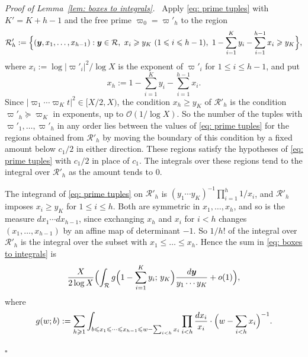 \documentclass{article}
\numberwithin{equation}{section}
\newenvironment{proof}[1][Proof]{\par\medskip\noindent\textit{#1.}\ }{\hfill$\square$\par\medskip}
\newcommand{\Le}{\leqslant}
\newcommand{\Ge}{\geqslant}
\begin{document}
\begin{proof}[Proof of Lemma~\ref{lem: boxes to integrals}]
Apply \eqref{eq: prime tuples} with $K' = K + h - 1$ and the free prime $\varpi_0 = \varpi'_h$ to the region
\begin{equation*}
\mathcal{R}'_h := \Bigl\{ (\boldsymbol{y}, x_1, \dots, x_{h-1}) : \boldsymbol{y} \in \mathcal{R},\ x_i \Ge y_K \ (1 \Le i \Le h - 1),\ 1 - \sum_{i=1}^{K} y_i - \sum_{i=1}^{h-1} x_i \Ge y_K \Bigr\},
\end{equation*}
where $x_i := \log|\varpi'_i|^2/\log X$ is the exponent of $\varpi'_i$ for $1 \Le i \Le h - 1$, and put
\begin{equation*}
x_h := 1 - \sum_{i=1}^{K} y_i - \sum_{i=1}^{h-1} x_i.
\end{equation*}
Since $|\varpi_1 \cdots \varpi_K t|^2 \in [X/2, X)$, the condition $x_h \Ge y_K$ of $\mathcal{R}'_h$ is the condition $\varpi'_h \succcurlyeq \varpi_K$ in exponents, up to $\mathcal{O}(1/\log X)$. So the number of the tuples with $\varpi'_1, \dots, \varpi'_h$ in any order lies between the values of \eqref{eq: prime tuples} for the regions obtained from $\mathcal{R}'_h$ by moving the boundary of this condition by a fixed amount below $c_1/2$ in either direction. These regions satisfy the hypotheses of \eqref{eq: prime tuples} with $c_1/2$ in place of $c_1$. The integrals over these regions tend to the integral over $\mathcal{R}'_h$ as the amount tends to $0$.

The integrand of \eqref{eq: prime tuples} on $\mathcal{R}'_h$ is $(y_1 \cdots y_K)^{-1} \prod_{i=1}^{h} 1/x_i$, and $\mathcal{R}'_h$ imposes $x_i \Ge y_K$ for $1 \Le i \Le h$. Both are symmetric in $x_1, \dots, x_h$, and so is the measure $dx_1 \cdots dx_{h-1}$, since exchanging $x_h$ and $x_i$ for $i < h$ changes $(x_1, \dots, x_{h-1})$ by an affine map of determinant $-1$. So $1/h!$ of the integral over $\mathcal{R}'_h$ is the integral over the subset with $x_1 \Le \dots \Le x_h$. Hence the sum in \eqref{eq: boxes to integrals} is
\begin{equation*}
\frac{X}{2\log X} \Bigl( \int_{\mathcal{R}} g\Bigl(1 - \sum_{i=1}^{K} y_i;\, y_K\Bigr) \frac{d\boldsymbol{y}}{y_1 \cdots y_K} + o(1) \Bigr),
\end{equation*}
where
\begin{equation*}
g(w; b) := \sum_{h \Ge 1} \int_{b \Le x_1 \Le \dots \Le x_{h-1} \Le w - \sum_{i < h} x_i} \prod_{i < h} \frac{dx_i}{x_i} \cdot \Bigl( w - \sum_{i < h} x_i \Bigr)^{-1}.
\end{equation*}


\end{proof}
\end{document}
